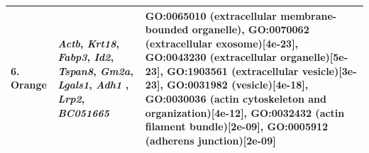 \documentclass[10pt,letterpaper]{article}
\begin{document}
\begin{table}[!hp]
\begin{adjustwidth}{-2in}{0in}
\begin{tabular}{|p{1.0in}|p{1.5in}|p{4.3in}|}
\hline
6. Orange & \textit{Actb}, \textit{Krt18}, \textit{Fabp3}, \textit{Id2}, \textit{Tspan8}, \textit{Gm2a}, \textit{Lgals1}, \textit{Adh1}
, \textit{Lrp2}, \textit{BC051665}
& GO:0065010 (extracellular membrane-bounded organelle), GO:0070062 (extracellular exosome)[4e-23],  GO:0043230 (extracellular organelle)[5e-23], GO:1903561 (extracellular vesicle)[3e-23], GO:0031982 (vesicle)[4e-18], GO:0030036 (actin cytoskeleton and organization)[4e-12], GO:0032432 (actin filament bundle)[2e-09],  GO:0005912 (adherens junction)[2e-09]\\
\hline
\end{tabular} \label{tab3}
\end{adjustwidth}
 \end{table}

 \clearpage

\end{document}
